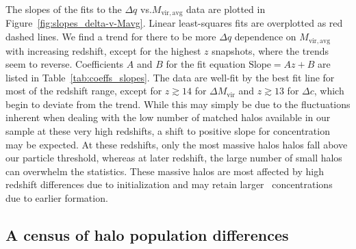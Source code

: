 The slopes of the fits to the $\Delta q$ vs.$M_{\mathrm{vir,avg}}$ data are plotted in Figure~\ref{fig:slopes_delta-v-Mavg}.  Linear least-squares fits are overplotted as red dashed lines.  We find a trend for there to be more $\Delta q$ dependence on $M_{\mathrm{vir,avg}}$ with increasing redshift, except for the highest $z$ snapshots, where the trends seem to reverse.  Coefficients $A$ and $B$ for the fit equation $\mathrm{Slope} = A z + B$ are listed in Table~\ref{tab:coeffs_slopes}.  The data are well-fit by the best fit line for most of the redshift range, except for $z \gtrsim 14$ for $\Delta M_{\mathrm{vir}}$ and $z \gtrsim 13$ for $\Delta c$, which begin to deviate from the trend.  While this may simply be due to the fluctuations inherent when dealing with the low number of matched halos available in our sample at these very high redshifts, a shift to positive slope for concentration may be expected.  At these redshifts, only the most massive halos halos fall above our particle threshold, whereas at later redshift, the large number of small halos can overwhelm the statistics.  These massive halos are most affected by high redshift differences due to initialization and may retain larger \lpt\ concentrations due to earlier formation.




\subsection{A census of halo population differences}


